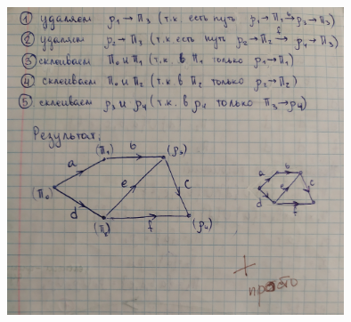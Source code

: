 \documentclass[discrete.tex]{subfiles}
\begin{document}
  \begin{figure}[H]
          \includegraphics[width=10cm]{pics/48_11}
          \centering
  \end{figure}
\end{document}
